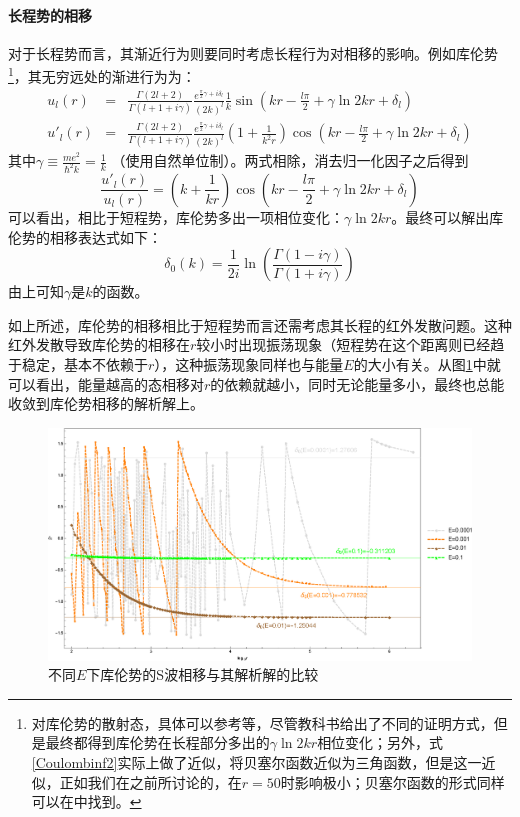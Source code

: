 \documentclass[cs4size,titlepage,twoside]{ctexart}
\begin{document}
\paragraph{长程势的相移}
对于长程势而言，其渐近行为则要同时考虑长程行为对相移的影响。例如库伦势\footnote{对库伦势的散射态，具体可以参考\cite{Landau,Weinberg}等，尽管教科书给出了不同的证明方式，但是最终都得到库伦势在长程部分多出的$\gamma\ln2kr$相位变化；另外，式\eqref{Coulombinf2}实际上做了近似，将贝塞尔函数近似为三角函数，但是这一近似，正如我们在之前所讨论的，在$r=50$时影响极小；贝塞尔函数的形式同样可以在\cite{Landau}中找到。}，其无穷远处的渐进行为为\cite{Jinyan}：
\begin{eqnarray}\label{Coulombinf2}
	u_l(r)&=&\frac{\Gamma(2l+2)}{\Gamma(l+1+i\gamma)}\frac{e^{\frac{\pi}{2}\gamma+i\delta_l}}{(2k)^l}\frac{1}{k}\sin(kr-\frac{l\pi}{2}+\gamma\ln2kr+\delta_l)\\
	u'_l(r)&=&\frac{\Gamma(2l+2)}{\Gamma(l+1+i\gamma)}\frac{e^{\frac{\pi}{2}\gamma+i\delta_l}}{(2k)^l}(1+\frac{1}{k^2r})\cos(kr-\frac{l\pi}{2}+\gamma\ln2kr+\delta_l)
\end{eqnarray}
其中$\displaystyle\gamma\equiv\frac{me^2}{\hbar^2k}=\frac{1}{k}$ （使用自然单位制）。两式相除，消去归一化因子之后得到
\begin{equation}\label{Coulombinffrac2}
	\frac{u'_l(r)}{u_l(r)}=(k+\frac{1}{kr})\cos(kr-\frac{l\pi}{2}+\gamma\ln2kr+\delta_l)
\end{equation}
可以看出，相比于短程势，库伦势多出一项相位变化：$\gamma\ln2kr$。最终可以解出库伦势的相移表达式如下：
\begin{equation}\label{delta0true0.001}
	\delta_0(k)=\frac{1}{2 i}\ln \left(\frac{\Gamma \left(1-i\gamma\right)}{\Gamma \left(1+i\gamma\right)}\right)
\end{equation}
由上可知$\gamma$是$k$的函数。

如上所述，库伦势的相移相比于短程势而言还需考虑其长程的红外发散问题。这种红外发散导致库伦势的相移在$r$较小时出现振荡现象（短程势在这个距离则已经趋于稳定，基本不依赖于$r$），这种振荡现象同样也与能量$E$的大小有关。从图\ref{sps3}中就可以看出，能量越高的态相移对$r$的依赖就越小，同时无论能量多小，最终也总能收敛到库伦势相移的解析解上。
\begin{figure}[!htbp]
	\centering
	\includegraphics[width=6.2in]{Test_PhaseShift_NA_Coulomb_etest1.eps}
	\caption{不同$E$下库伦势的S波相移与其解析解的比较}\label{sps3}
\end{figure}
\end{document}
